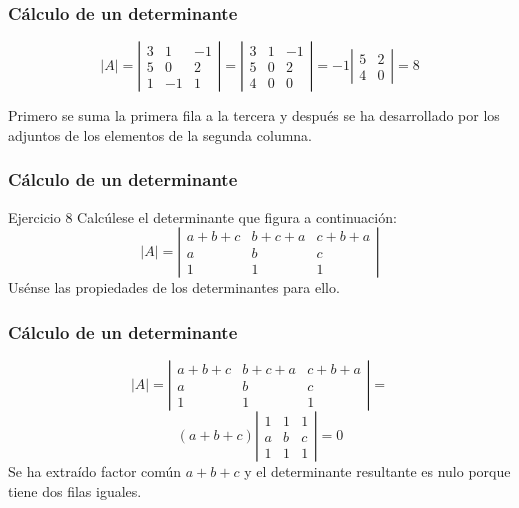 \documentclass[12pt]{article}
\begin{document}
\begin{frame}
  \frametitle{C\'alculo de un determinante}
\[|A| = \left|\begin{array}{ccc}3 & 1 & -1 \\5 & 0 & 2 \\1 & -1 & 1\end{array}\right| = 
\left|\begin{array}{ccc}3 & 1 & -1 \\5 & 0 & 2 \\4 & 0 & 0\end{array}\right| = 
-1 \left|\begin{array}{cc}5 & 2 \\4 & 0\end{array}\right| = 8 \]

Primero se suma la primera fila a la tercera y despu\'es se ha desarrollado por los adjuntos de los elementos de la segunda columna.
\end{frame} 

\begin{frame}
  \frametitle{C\'alculo de un determinante}
     \begin{block}{Ejercicio 8}
Calc\'ulese el determinante que figura a continuaci\'on:
\[|A| = \left|\begin{array}{ccc}a+b+c & b+c+a & c+b+a \\a & b & c \\1 & 1 & 1\end{array}\right|\]
Us\'ense las propiedades de los determinantes para ello.
\end{block}
\end{frame} 


\begin{frame}
  \frametitle{C\'alculo de un determinante}
\[|A| = \left|\begin{array}{ccc}a+b+c & b+c+a & c+b+a \\a & b & c \\1 & 1 & 1\end{array}\right| = \]
\[
(a+b+c) \left|\begin{array}{ccc}1 & 1 & 1 \\a & b & c \\1 & 1 & 1\end{array}\right|  = 0\]
Se ha extra\'ido factor com\'un $a + b + c$ y el determinante resultante es nulo porque tiene dos filas iguales.
\end{frame} 
\end{document}

